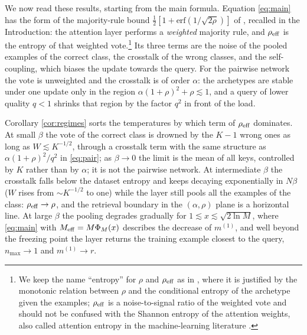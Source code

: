\documentclass{SciPost}
\theoremstyle{plain}
\theoremstyle{definition}
\newcommand{\Meff}{M_{\rm eff}}
\newcommand{\erf}{\mathrm{erf}}
\begin{document}
We now read these results, starting from the main formula. Equation \eqref{eq:main} has the form of the majority-rule bound $\frac12[1+\erf(1/\sqrt{2\rho})]$ of \cite{Alemanno2023}, recalled in the Introduction: the attention layer performs a \emph{weighted} majority rule, and $\rho_{\rm eff}$ is the entropy of that weighted vote.\footnote{We keep the name ``entropy'' for $\rho$ and $\rho_{\rm eff}$ as in \cite{Alemanno2023}, where it is justified by the monotonic relation between $\rho$ and the conditional entropy of the archetype given the examples; $\rho_{\rm eff}$ is a noise-to-signal ratio of the weighted vote and should not be confused with the Shannon entropy of the attention weights, also called attention entropy in the machine-learning literature \cite{Zhai2023}.} Its three terms are the noise of the pooled examples of the correct class, the crosstalk of the wrong classes, and the self-coupling, which biases the update towards the query. For the pairwise network the vote is unweighted and the crosstalk is of order $\alpha$: the archetypes are stable under one update only in the region $\alpha(1+\rho)^2+\rho\lesssim1$, and a query of lower quality $q<1$ shrinks that region by the factor $q^2$ in front of the load.

Corollary \ref{cor:regimes} sorts the temperatures by which term of $\rho_{\rm eff}$ dominates. At small $\beta$ the vote of the correct class is drowned by the $K-1$ wrong ones as long as $W\lesssim K^{-1/2}$, through a crosstalk term with the same structure as $\alpha(1+\rho)^2/q^2$ in \eqref{eq:pair}; as $\beta\to0$ the limit is the mean of all keys, controlled by $K$ rather than by $\alpha$; it is not the pairwise network. At intermediate $\beta$ the crosstalk falls below the dataset entropy and keeps decaying exponentially in $N\beta$ ($W$ rises from $\sim K^{-1/2}$ to one) while the layer still pools all the examples of the class: $\rho_{\rm eff}\to\rho$, and the retrieval boundary in the $(\alpha,\rho)$ plane is a horizontal line. At large $\beta$ the pooling degrades gradually for $1\lesssim x\lesssim\sqrt{2\ln M}$, where \eqref{eq:main} with $\Meff=M\Phi_M(x)$ describes the decrease of $m^{(1)}$, and well beyond the freezing point the layer returns the training example closest to the query, $n_{\max}\to1$ and $m^{(1)}\to r$.
\end{document}
